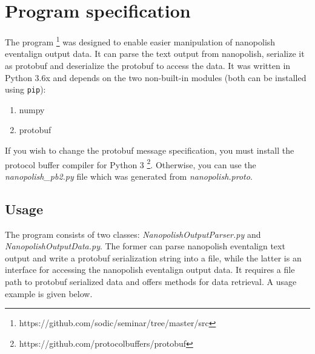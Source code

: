 \documentclass[times, utf, seminar]{fer}
\begin{document}
\section{Program specification}
The program 
\footnote{https://github.com/sodic/seminar/tree/master/src}
was designed to enable easier manipulation of nanopolish eventalign 
output data. It can parse the text output from nanopolish, serialize it as protobuf and 
deserialize the protobuf to access the data. It was written in Python 3.6x and
depends on the two non-built-in modules (both can be installed using \texttt{pip}):
\begin{enumerate}
	\item numpy
	\item protobuf
\end{enumerate}
 If you wish to change the protobuf message
specification, you must install the protocol buffer compiler for Python 3
\footnote{https://github.com/protocolbuffers/protobuf}.
Otherwise, you can use the \textit{nanopolish\_pb2.py} file which was generated from
\textit{nanopolish.proto}.

\subsection{Usage}
The program consists of two classes: \textit{NanopolishOutputParser.py} and 
\textit{NanopolishOutputData.py}. The former can parse nanopolish 
eventalign text output and write a protobuf serialization string into a file, while
the latter is an interface for accessing the nanopolish eventalign output data. It requires 
a file path to protobuf serialized data and offers methods for data retrieval. 
A usage example is given below. 


\end{document}
